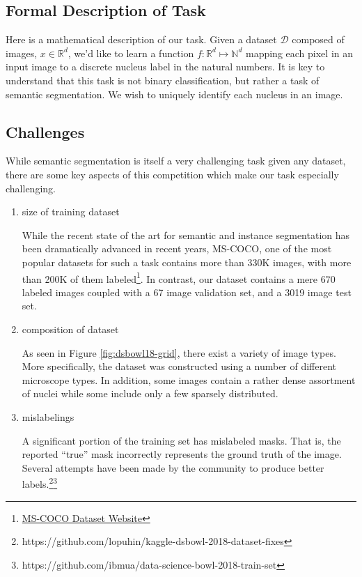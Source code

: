 \documentclass[paper=letter, fontsize=12pt]{article}
\numberwithin{equation}{section} %
\numberwithin{figure}{section} %
\numberwithin{table}{section} %
\begin{document}
\subsection{Formal Description of Task}

Here is a mathematical description of our task.  Given a dataset $\mathcal{D}$
composed of images, $x \in \mathbb{R}^{d}$, we'd like to learn a function $f :
\mathbb{R}^{d} \mapsto \mathbb{N}^{d}$ mapping each pixel in an input image to
a discrete nucleus label in the natural numbers.  It is key to understand that
this task is not binary classification, but rather a task of semantic
segmentation.  We wish to uniquely identify each nucleus in an image.

\subsection{Challenges}

While semantic segmentation is itself a very challenging task given any 
dataset, there are some key aspects of this competition which make our task
especially challenging.
\begin{enumerate}
    \item size of training dataset

        While the recent state of the art for semantic and instance
        segmentation has been dramatically advanced in recent years, MS-COCO,
        one of the most popular datasets for such a task contains more than
        330K images, with more than 200K of them
        labeled\footnote{\href{http://cocodataset.org}{MS-COCO Dataset
        Website}}.  In contrast, our dataset contains a mere 670 labeled images
        coupled with a 67 image validation set, and a 3019 image test set.
    \item composition of dataset

        As seen in Figure \ref{fig:dsbowl18-grid}, there exist a variety of
        image types.  More specifically, the dataset was constructed using a 
        number of different microscope types.  In addition, some images contain
        a rather dense assortment of nuclei while some include only a few 
        sparsely distributed.
    \item mislabelings

        A significant portion of the training set has mislabeled masks.  That
        is, the reported ``true'' mask incorrectly represents the ground truth
        of the image.  Several attempts have been made by the community to
        produce better
        labels.\footnote{https://github.com/lopuhin/kaggle-dsbowl-2018-dataset-fixes}\footnote{https://github.com/ibmua/data-science-bowl-2018-train-set}
\end{enumerate}
\end{document}
